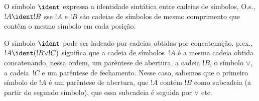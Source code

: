\documentclass[../../../include/open-logic-section]{subfiles}
\begin{document}
\begin{defn}
O símbolo $\ident$ expressa a identidade sintática entre cadeias de
símbolos, O.s.\@, $!A \ident !B$ sse $!A$ e $!B$ são cadeias de
símbolos de mesmo comprimento que contêm o mesmo símbolo em cada
posição.
\end{defn}

O símbolo $\ident$ pode ser ladeado por cadeias obtidas por
concatenação. p.ex., $!A \ident (!B \lor !C)$ significa que a
cadeia de símbolos~$!A$ é a mesma cadeia obtida concatenando, nessa
ordem, um parêntese de abertura, a cadeia $!B$, o símbolo $\lor$, a
cadeia~$!C$ e um parêntese de fechamento. Nesse caso, sabemos que o
primeiro símbolo de $!A$ é um parêntese de abertura, que $!A$ contém
$!B$ como subcadeia (a partir do segundo símbolo), que essa subcadeia
é seguida por $\lor$ etc.
\end{document}
